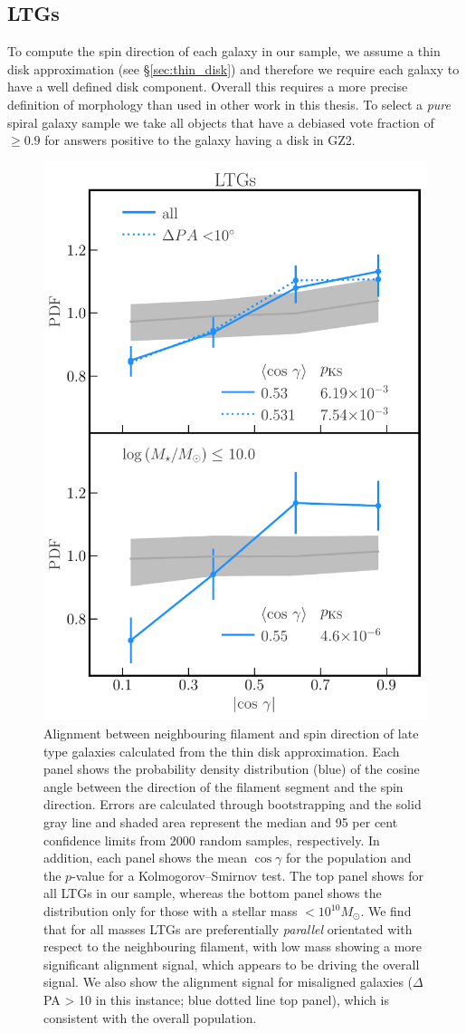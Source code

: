 \subsection{LTGs}
To compute the spin direction of each galaxy in our sample, we assume a thin disk approximation (see \S\ref{sec:thin_disk}) and therefore we require each galaxy to have a well defined disk component. Overall this requires a more precise definition of morphology than used in other work in this thesis. To select a \textit{pure} spiral galaxy sample we take all objects that have a debiased vote fraction of $\geq 0.9$ for answers positive to the galaxy having a disk in GZ2. 

\begin{figure}
    \centering
    \includegraphics[width=0.65\linewidth]{thesis/latex/cw_spin/spin_fil_LTGs_2in1.pdf}
    \caption{Alignment between neighbouring filament and spin direction of late type galaxies calculated from the thin disk approximation. Each panel shows the probability density distribution (blue) of the cosine angle between the direction of the filament segment and the spin direction. Errors are calculated through bootstrapping and the solid gray line and shaded area represent the median and 95 per cent confidence limits from 2000 random samples, respectively. In addition, each panel shows the mean $\cos \gamma$ for the population and the $p$-value for a Kolmogorov--Smirnov test. The top panel shows for all LTGs in our sample, whereas the bottom panel shows the distribution only for those with a stellar mass $< 10^{10} M_{\odot}$. We find that for all masses LTGs are preferentially \textit{parallel} orientated with respect to the neighbouring filament, with low mass showing a more significant alignment signal, which appears to be driving the overall signal. We also show the alignment signal for misaligned galaxies ($\Delta$PA > 10 in this instance; blue dotted line top panel), which is consistent with the overall population.}
    \label{fig:ltgs_spin_alignment} 
\end{figure}

